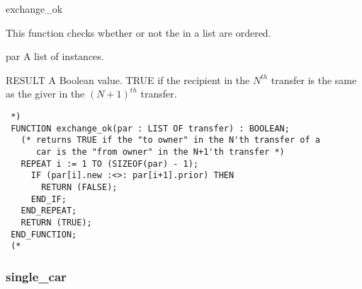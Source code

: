 \documentclass{article}
\begin{document}
 \begin{Mnamedesc}{exchange_ok}

 \begin{Mdesctext}

 This function checks whether or not the  in a list are
 ordered.

 \end{Mdesctext}

 \begin{Ipars}

 \item[par] A list of  instances.

 \item[RESULT] A Boolean value. TRUE if the recipient in the $N^{th}$ transfer
 is the same as the giver in the $(N+1)^{th}$ transfer.

 \end{Ipars}

 \begin{Mexp}
 \begin{verbatim}
 *)
 FUNCTION exchange_ok(par : LIST OF transfer) : BOOLEAN;
   (* returns TRUE if the "to owner" in the N'th transfer of a
      car is the "from owner" in the N+1'th transfer *)
   REPEAT i := 1 TO (SIZEOF(par) - 1);
     IF (par[i].new :<>: par[i+1].prior) THEN
       RETURN (FALSE);
     END_IF;
   END_REPEAT;
   RETURN (TRUE);
 END_FUNCTION;
 (*
 \end{verbatim}
 \end{Mexp}
 \end{Mnamedesc}

 \subsubsection{single\_car}
\end{document}
